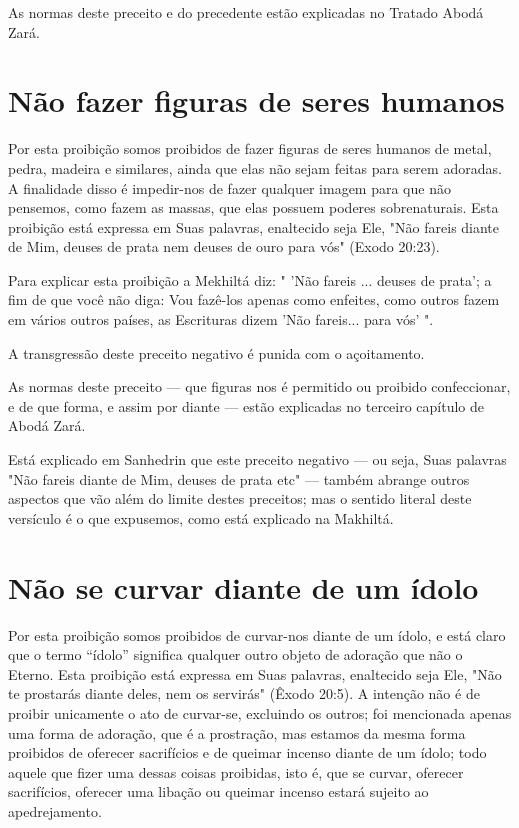 As normas deste preceito e do precedente estão explicadas no Tra­tado
Abodá Zará.

\section{Não fazer figuras de seres humanos}

Por esta proibição somos proibidos de fazer figuras de seres huma­nos de
metal, pedra, madeira e similares, ainda que elas não sejam feitas para
serem adoradas. A finalidade disso é impedir-nos de fazer qualquer
imagem pa­ra que não pensemos, como fazem as massas, que elas possuem
poderes sobre­naturais. Esta proibição está expressa em Suas palavras,
enaltecido seja Ele, "Não fareis diante de Mim, deuses de prata nem
deuses de ouro para vós" (Exodo 20:23).

Para explicar esta proibição a Mekhiltá diz: " 'Não fareis ... deuses de
prata'; a fim de que você não diga: Vou fazê-los apenas como enfeites,
como outros fazem em vários outros países, as Escrituras dizem 'Não
fareis... para vós' ".

A transgressão deste preceito negativo é punida com o açoitamento.

As normas deste preceito --- que figuras nos é permitido ou proibi­do
confeccionar, e de que forma, e assim por diante --- estão explicadas no
ter­ceiro capítulo de Abodá Zará.

Está explicado em Sanhedrin que este preceito negativo --- ou seja, Suas
palavras "Não fareis diante de Mim, deuses de prata etc" --- também
abrange outros aspectos que vão além do limite destes preceitos; mas o
sentido literal deste versículo é o que expusemos, como está explicado
na Makhiltá.

\section{Não se curvar diante de um ídolo}

Por esta proibição somos proibidos de curvar-nos diante de um ído­lo, e
está claro que o termo ``ídolo'' significa qualquer outro objeto de
adora­ção que não o Eterno. Esta proibição está expressa em Suas
palavras, enalteci­do seja Ele, "Não te prostarás diante deles, nem os
servirás" (Êxodo 20:5). A intenção não é de proibir unicamente o ato de
curvar-se, excluindo os outros; foi mencionada apenas uma forma de
adoração, que é a prostração, mas esta­mos da mesma forma proibidos de
oferecer sacrifícios e de queimar incenso diante de um ídolo; todo
aquele que fizer uma dessas coisas proibidas, isto é, que se curvar,
oferecer sacrifícios, oferecer uma libação ou queimar incenso estará
sujeito ao apedrejamento.


